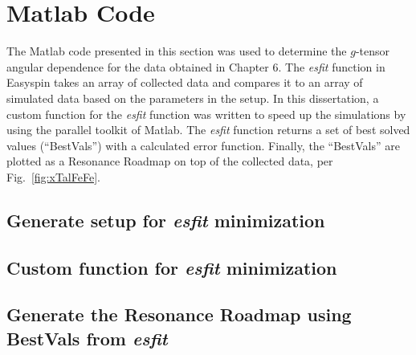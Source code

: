 \chapter[Matlab Code]{Matlab Code}

The Matlab code presented in this section was used to determine the $g$-tensor angular dependence for the data obtained in Chapter 6. The \textit{esfit} function in Easyspin takes an array of collected data and compares it to an array of simulated data based on the parameters in the setup. In this dissertation, a custom function for the \textit{esfit} function was written to speed up the simulations by using the parallel toolkit of Matlab. The \textit{esfit} function returns a set of best solved values (``BestVals'') with a calculated error function. Finally, the ``BestVals'' are plotted as a Resonance Roadmap on top of the collected data, per Fig.~\ref{fig:xTalFeFe}.


\section*{Generate setup for {\em esfit} minimization}

\newpage

\section*{Custom function for {\em esfit} minimization}

\newpage


\section*{Generate the Resonance Roadmap using BestVals from {\em esfit}}

